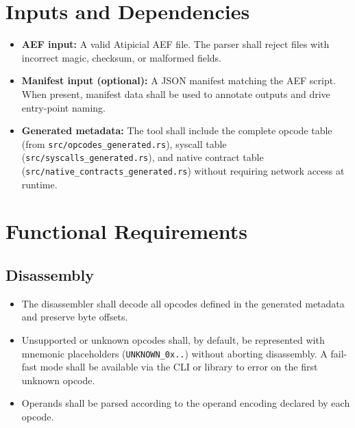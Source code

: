 \documentclass[11pt]{article}
\begin{document}
\section{Inputs and Dependencies}\label{sec:inputs}
\begin{itemize}[nosep]
    \item \textbf{AEF input:} A valid Atipicial  AEF file. The parser shall reject
    files with incorrect magic, checksum, or malformed fields.
    \item \textbf{Manifest input (optional):} A JSON manifest matching the AEF
    script. When present, manifest data shall be used to annotate outputs and
    drive entry-point naming.
    \item \textbf{Generated metadata:} The tool shall include the complete
    opcode table (from \texttt{src/opcodes\_generated.rs}), syscall table
    (\texttt{src/syscalls\_generated.rs}), and native contract table
    (\texttt{src/native\_contracts\_generated.rs}) without requiring network
    access at runtime.
\end{itemize}

\section{Functional Requirements}
\subsection{Disassembly}
\begin{itemize}[nosep]
    \item The disassembler shall decode all opcodes defined in the generated
    metadata and preserve byte offsets.
    \item Unsupported or unknown opcodes shall, by default, be represented with
    mnemonic placeholders (\texttt{UNKNOWN\_0x..}) without aborting disassembly.
    A fail-fast mode shall be available via the CLI or library to error on the
    first unknown opcode.
    \item Operands shall be parsed according to the operand encoding declared by
    each opcode.
\end{itemize}
\end{document}
